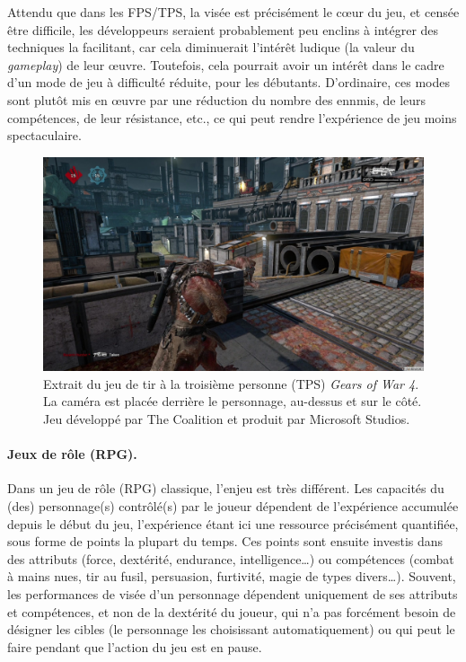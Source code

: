 	Attendu que dans les FPS/TPS, la visée est précisément le cœur du jeu, et censée être difficile, les développeurs seraient probablement peu enclins à intégrer des techniques la facilitant, car cela diminuerait l'intérêt ludique (la valeur du \emph{gameplay}) de leur œuvre. Toutefois, cela pourrait avoir un intérêt dans le cadre d'un mode de jeu à difficulté réduite, pour les débutants. D'ordinaire, ces modes sont plutôt mis en œuvre par une réduction du nombre des ennmis, de leurs compétences, de leur résistance, etc., ce qui peut rendre l'expérience de jeu moins spectaculaire.
	
	\begin{figure}[H]
		\centering
		\includegraphics[width=\textwidth]{figures/ch1/gears}
		\caption[Le TPS \emph{Gears of War 4}.]{Extrait du jeu de tir à la troisième personne (TPS) \emph{Gears of War 4}. La caméra est placée derrière le personnage, au-dessus et sur le côté. Jeu développé par The Coalition et produit par Microsoft Studios.}
		\label{fig:gears}
	\end{figure}
	
	\paragraph{Jeux de rôle (RPG).}
	Dans un jeu de rôle (RPG) classique, l'enjeu est très différent. Les capacités du (des) personnage(s) contrôlé(s) par le joueur dépendent de l'expérience accumulée depuis le début du jeu, l'expérience étant ici une ressource précisément quantifiée, sous forme de points la plupart du temps. Ces points sont ensuite investis dans des attributs (force, dextérité, endurance, intelligence\ldots{}) ou compétences (combat à mains nues, tir au fusil, persuasion, furtivité, magie de types divers\ldots{}). Souvent, les performances de visée d'un personnage dépendent uniquement de ses attributs et compétences, et non de la dextérité du joueur, qui n'a pas forcément besoin de désigner les cibles (le personnage les choisissant automatiquement) ou qui peut le faire pendant que l'action du jeu est en pause.
	
